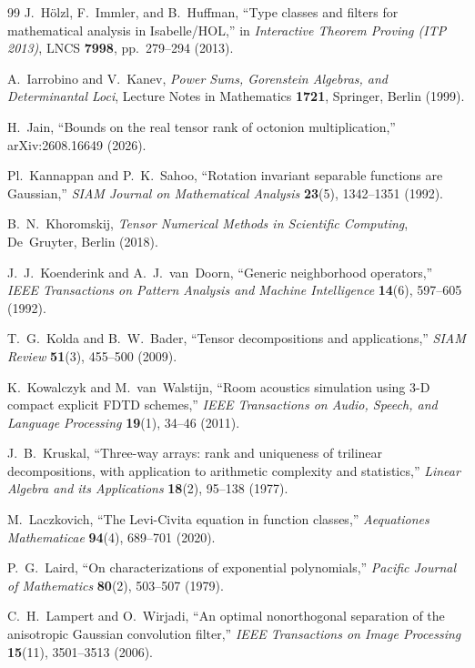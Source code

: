 \documentclass[11pt,a4paper]{article}
\theoremstyle{plain}
\theoremstyle{definition}
\begin{document}
\begin{thebibliography}{99}
J.~H\"olzl, F.~Immler, and B.~Huffman,
``Type classes and filters for mathematical analysis in Isabelle/HOL,''
in \emph{Interactive Theorem Proving (ITP 2013)}, LNCS \textbf{7998}, pp.~279--294 (2013).

A.~Iarrobino and V.~Kanev,
\emph{Power Sums, Gorenstein Algebras, and Determinantal Loci},
Lecture Notes in Mathematics \textbf{1721}, Springer, Berlin (1999).

H.~Jain,
``Bounds on the real tensor rank of octonion multiplication,''
arXiv:2608.16649 (2026).

Pl.~Kannappan and P.~K.~Sahoo,
``Rotation invariant separable functions are Gaussian,''
\emph{SIAM Journal on Mathematical Analysis} \textbf{23}(5), 1342--1351 (1992).

B.~N.~Khoromskij,
\emph{Tensor Numerical Methods in Scientific Computing},
De~Gruyter, Berlin (2018).

J.~J.~Koenderink and A.~J.~van~Doorn,
``Generic neighborhood operators,''
\emph{IEEE Transactions on Pattern Analysis and Machine Intelligence} \textbf{14}(6), 597--605 (1992).

T.~G.~Kolda and B.~W.~Bader,
``Tensor decompositions and applications,''
\emph{SIAM Review} \textbf{51}(3), 455--500 (2009).

K.~Kowalczyk and M.~van~Walstijn,
``Room acoustics simulation using 3-D compact explicit FDTD schemes,''
\emph{IEEE Transactions on Audio, Speech, and Language Processing} \textbf{19}(1), 34--46 (2011).

J.~B.~Kruskal,
``Three-way arrays: rank and uniqueness of trilinear decompositions, with application to arithmetic complexity and statistics,''
\emph{Linear Algebra and its Applications} \textbf{18}(2), 95--138 (1977).

M.~Laczkovich,
``The Levi-Civita equation in function classes,''
\emph{Aequationes Mathematicae} \textbf{94}(4), 689--701 (2020).

P.~G.~Laird,
``On characterizations of exponential polynomials,''
\emph{Pacific Journal of Mathematics} \textbf{80}(2), 503--507 (1979).

C.~H.~Lampert and O.~Wirjadi,
``An optimal nonorthogonal separation of the anisotropic Gaussian convolution filter,''
\emph{IEEE Transactions on Image Processing} \textbf{15}(11), 3501--3513 (2006).


\end{thebibliography}
\end{document}
